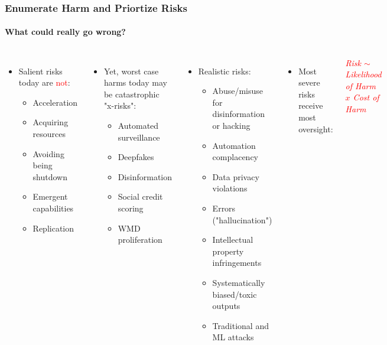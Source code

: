 \documentclass[11pt,
               aspectratio=169,
               hyperref={colorlinks}
               ]{beamer}
\begin{document}
		\begin{frame}
			
			\frametitle{Enumerate Harm and Priortize Risks}
			\framesubtitle{What could really go wrong?}
			
			\begin{columns}
				\vspace{-5pt}
				\begin{itemize}
					\item Salient risks today are \textcolor{red}{not}:
						\begin{itemize}
							\item Acceleration
							\item Acquiring resources
							\item Avoiding being shutdown
							\item Emergent capabilities
							\item Replication 
						\end{itemize}
				\end{itemize}
				\begin{itemize}
					\item Yet, worst case harms today may be catastrophic "x-risks":
						\begin{itemize}
							\item Automated surveillance
							\item Deepfakes
							\item Disinformation
							\item Social credit scoring
							\item WMD proliferation
						\end{itemize}
				\end{itemize}
				\vspace{-5pt}
				\begin{itemize}
					\item Realistic risks:
						\begin{itemize}
							\item Abuse/misuse for disinformation or hacking
							\item Automation complacency
							\item Data privacy violations
							\item Errors ("hallucination")
							\item Intellectual property infringements
							\item Systematically biased/toxic outputs
							\item Traditional and ML attacks
						\end{itemize}
				\end{itemize}
				\begin{itemize}
					\item Most severe risks receive most oversight:
				\end{itemize}
				\vspace{10pt}
				\textcolor{red}{\textit{Risk $\sim$ Likelihood of Harm $x$ Cost of Harm}}
			\end{columns}
					
		\end{frame}
		
\end{document}
